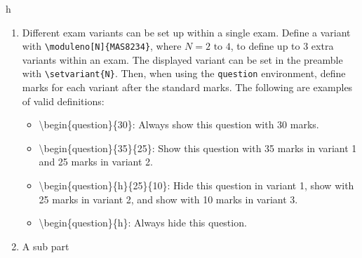 \documentclass[12pt,a4paper]{article} %
\begin{document}
\begin{question}{35}{h}
\begin{enumerate}
\item Different exam variants can be set up within a single exam. Define a variant with \texttt{\textbackslash moduleno[N]\{MAS8234\}}, where $N=2\text{ to }4$, to define up to 3 extra variants within an exam. The displayed variant can be set in the preamble with \texttt{\textbackslash setvariant\{N\}}. Then, when using the \texttt{question} environment, define marks for each variant after the standard marks. The following are examples of valid definitions:
\begin{itemize}
\item \textbackslash begin\{question\}\{30\}: Always show this question with 30 marks.
\item \textbackslash begin\{question\}\{35\}\{25\}: Show this question with 35 marks in variant 1 and 25 marks in variant 2.
\item \textbackslash begin\{question\}\{h\}\{25\}\{10\}: Hide this question in variant 1, show with 25 marks in variant 2, and show with 10 marks in variant 3.
\item \textbackslash begin\{question\}\{h\}: Always hide this question.
\end{itemize}
\item A sub part
\end{enumerate}
\end{question}
\end{document}
